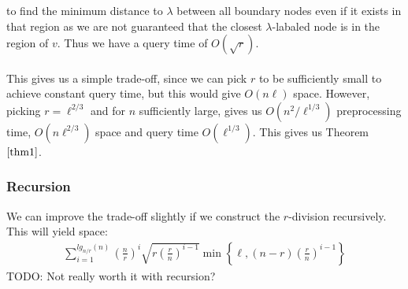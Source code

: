 to find the minimum distance to $\lambda$ between all boundary nodes even if it exists in
that region as we are not guaranteed that the closest $\lambda$-labaled node is in the
region of $v$. Thus we have a query time of $O(\sqrt{r})$. \\
\\
This gives us a simple trade-off, since we can pick $r$ to be sufficiently small to
achieve constant query time, but this would give $O(n\ell)$ space. However, picking
$r=\ell^{2/3}$ and for $n$ sufficiently large, gives us $O(n^2/\ell^{1/3})$ preprocessing time, $O(n\ell^{2/3})$ space and query time $O(\ell^{1/3})$. This gives us Theorem $\ref{thm1}$.

\subsubsection{Recursion}
We can improve the trade-off slightly if we construct the $r$-division recursively. This will
yield space:
\begin{align*}
  \sum_{i=1}^{lg_{n/r}(n)} \left(\frac{n}{r}\right)^i
  \sqrt{r\left(\frac{r}{n}\right)^{i-1}} \min
  \left\{\ell,\left(n-r\right)\left(\frac{r}{n}\right)^{i-1}\right\}
\end{align*}
TODO: Not really worth it with recursion?

